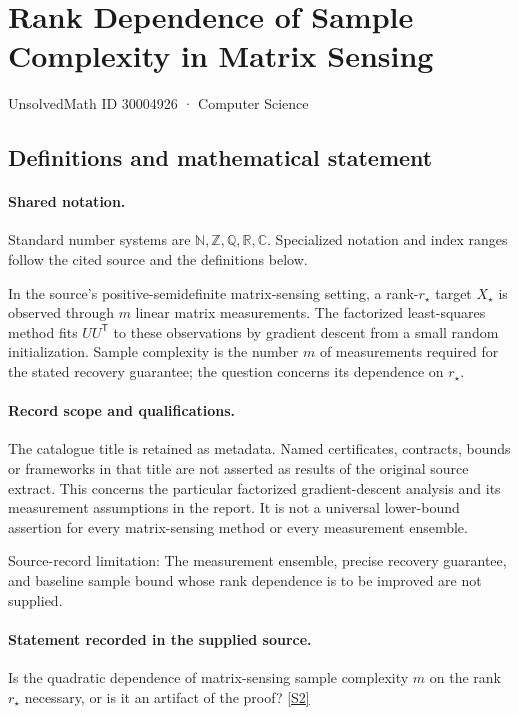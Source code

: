 \documentclass[11pt]{article}
\newcommand{\sref}[2]{\hyperlink{source:#1:#2}{[S#2]}}
\begin{document}
\setcounter{section}{30004925}
\section{Rank Dependence of Sample Complexity in Matrix Sensing}\label{30004926}
{\small\sffamily UnsolvedMath ID 30004926 · Computer Science}
\subsection{Definitions and mathematical statement}

\paragraph{Shared notation.}Standard number systems are $\mathbb N,\mathbb Z,\mathbb Q,\mathbb R,\mathbb C$. Specialized notation and index ranges follow the cited source and the definitions below.


In the source's positive-semidefinite matrix-sensing setting, a rank-$r_\star$ target $X_\star$ is observed through $m$ linear matrix measurements. The factorized least-squares method fits $UU^{\mathsf T}$ to these observations by gradient descent from a small random initialization. Sample complexity is the number $m$ of measurements required for the stated recovery guarantee; the question concerns its dependence on $r_\star$.
\paragraph{Record scope and qualifications.}
The catalogue title is retained as metadata. Named certificates, contracts, bounds or frameworks in that title are not asserted as results of the original source extract.
This concerns the particular factorized gradient-descent analysis and its measurement assumptions in the report. It is not a universal lower-bound assertion for every matrix-sensing method or every measurement ensemble.

Source-record limitation: The measurement ensemble, precise recovery guarantee, and baseline sample bound whose rank dependence is to be improved are not supplied.
\paragraph{Statement recorded in the supplied source.}
Is the quadratic dependence of matrix-sensing sample complexity $m$ on the rank $r_\star$ necessary, or is it an artifact of the proof? \sref{30004926}{2}
\end{document}
